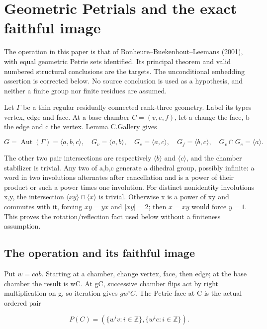 \section{Geometric Petrials and the exact faithful
image}\label{geometric-petrials-and-the-exact-faithful-image}

The operation in this paper is that of Bonheure--Buekenhout--Leemans
(2001), with equal geometric Petrie sets identified. Its principal
theorem and valid numbered structural conclusions are the targets. The
unconditional embedding assertion is corrected below. No source
conclusion is used as a hypothesis, and neither a finite group nor
finite residues are assumed.

Let \(\Gamma\) be a thin regular residually connected rank-three
geometry. Label its types vertex, edge and face. At a base chamber
\(C=(v,e,f)\), let a change the face, b the edge and c the vertex. Lemma
C.Gallery gives

\[
 G=\operatorname{Aut}(\Gamma)=\langle a,b,c\rangle,
 \quad G_v=\langle a,b\rangle,\quad G_e=\langle a,c\rangle,
 \quad G_f=\langle b,c\rangle,\quad G_v\cap G_e=\langle a\rangle.
 \tag{P1}
\]

The other two pair intersections are respectively \(\langle b\rangle\)
and \(\langle c\rangle\), and the chamber stabilizer is trivial. Any two
of a,b,c generate a dihedral group, possibly infinite: a word in two
involutions alternates after cancellation and is a power of their
product or such a power times one involution. For distinct nonidentity
involutions x,y, the intersection
\(\langle xy\rangle \cap \langle x\rangle\) is trivial. Otherwise x is a
power of xy and commutes with it, forcing \(xy=yx\) and \(|xy|=2\); then
\(x=xy\) would force \(y=1\). This proves the rotation/reflection fact
used below without a finiteness assumption.

\subsection{The operation and its faithful
image}\label{the-operation-and-its-faithful-image}

Put \(w=cab\). Starting at a chamber, change vertex, face, then edge; at
the base chamber the result is wC. At gC, successive chamber flips act
by right multiplication on g, so iteration gives \(gw^iC\). The Petrie
face at C is the actual ordered pair

\[
 P(C)=\left(\{w^iv:i\in\mathbb Z\},\{w^ie:i\in\mathbb Z\}\right).
 \tag{P2}
\]

